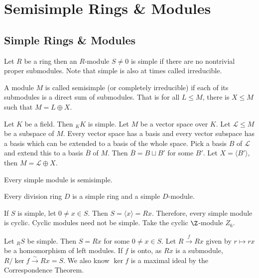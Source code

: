 
\newpage
\section{Semisimple Rings \& Modules}

\subsection{Simple Rings \& Modules}

\begin{dfn}
Let $R$ be a ring then an $R$-module $S\neq 0$ is simple if there are no nontrivial proper submodules. Note that simple is also at times called irreducible. 

A module $M$ is called semisimple (or completely irreducible) if each of its submodules is a direct sum of submodules. That is for all $L \leq M$, there is $X \leq M$ such that $M=L \oplus X$. 
\end{dfn}

\begin{example}
Let $K$ be a field. Then $_KK$ is simple. Let $M$ be a vector space over $K$. Let $\mathcal{L} \leq M$ be a subspace of $M$. Every vector space has a basis and every vector subspace has a basis which can be extended to a basis of the whole space. Pick a basis $B$ of $\mathcal{L}$ and extend this to a basis $\overline{B}$ of $M$. Then $\overline{B}=B \sqcup B'$ for some $B'$. Let $X= \langle B' \rangle$, then $M= \mathcal{L} \oplus X$.
\end{example}

\begin{example}
Every simple module is semisimple.
\end{example}

\begin{example}
Every division ring $D$ is a simple ring and a simple $D$-module. 
\end{example}

\begin{example}
If $S$ is simple, let $0 \neq x \in S$. Then $S=\langle x \rangle=Rx$. Therefore, every simple module is cyclic. Cyclic modules need not be simple. Take the cyclic $\Z$-module $Z_6$.
\end{example}

\begin{example}
Let $_RS$ be simple. Then $S=Rx$ for some $0 \neq x \in S$. Let $R \stackrel{f}{\rightarrow} Rx$ given by $r \mapsto rx$ be a homomorphism of left modules. If $f$ is onto, as $Rx$ is a submodule, $R/\ker f \stackrel{\sim}{\rightarrow} Rx=S$. We also know $\ker f$ is a maximal ideal by the Correspondence Theorem.

\end{example}

